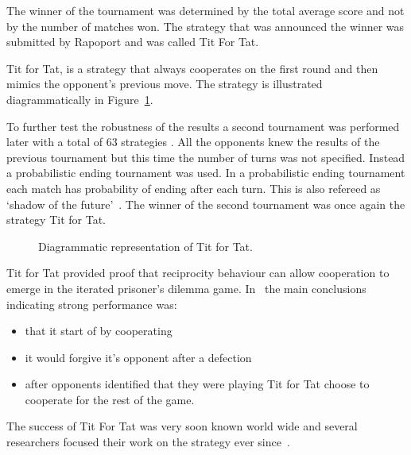 \documentclass{article}
\begin{document}
The winner of the tournament was determined by the total average score and not by
the number of matches won. The strategy that was announced the winner was
submitted by Rapoport and was called Tit For Tat.

Tit for Tat, is a strategy that always cooperates on the first round and then
mimics the opponent's previous move. The strategy is illustrated diagrammatically
in Figure~\ref{fig:tit_for_tat_diagram}.

To further test the robustness of the
results a second tournament was performed later with a total of 63 strategies
\cite{axelrod1980b}. All the opponents knew the results of the previous
tournament but this time the number of turns was not specified. Instead
a probabilistic ending tournament was used. In a probabilistic ending tournament
each match has probability of ending after each turn. This is also refereed as
`shadow of the future'~\cite{axelrod1988}. The winner of the second tournament
was once again the strategy Tit for Tat.

\begin{figure}[!hbtp]
    \centering
    
    \caption{Diagrammatic representation of Tit for Tat.}
    \label{fig:tit_for_tat_diagram}
\end{figure}

Tit for Tat provided proof that reciprocity behaviour can allow cooperation
to emerge in the iterated prisoner's dilemma game. In~\cite{Axelrod1981}
the main conclusions indicating strong performance was:

\begin{itemize}
    \item that it start of by cooperating
    \item it would forgive it's opponent after a defection
    \item after opponents identified that they were playing Tit for Tat choose
    to cooperate for the rest of the game.
\end{itemize}

The success of Tit For Tat was very soon known world wide and several researchers
focused their work on the strategy ever since~\cite{Douglas2011, Krama2012, Milinski1987}.
\end{document}
